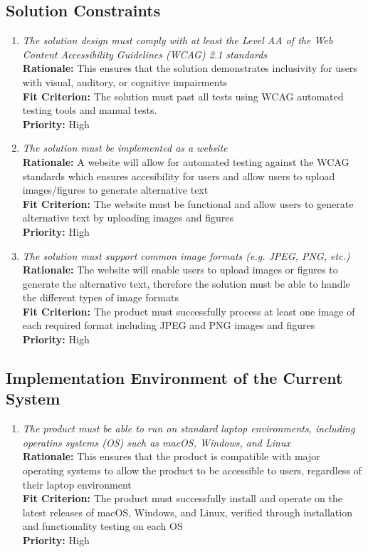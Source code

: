 \documentclass[12pt]{article}
\begin{document}
\subsection{Solution Constraints}
\begin{enumerate}[label=MD-SL \arabic*., wide=0pt, leftmargin=*]
  \item \emph{The solution design must comply with at least the Level AA of the Web Content Accessibility Guidelines (WCAG) 2.1 standards}\\[2mm]
    {\bf Rationale:} This ensures that the solution demonstrates inclusivity for users with visual, auditory, or cognitive impairments\\
    {\bf Fit Criterion:} The solution must past all tests using WCAG automated testing tools and manual tests.\\
    {\bf Priority:} High
  \item \emph{The solution must be implemented as a website}\\[2mm]
    {\bf Rationale:} A website will allow for automated testing against the WCAG standards which ensures accesibility for users 
    and allow users to upload images/figures to generate alternative text\\
    {\bf Fit Criterion:} The website must be functional and allow users to generate alternative text by uploading
    images and figures\\
    {\bf Priority:} High
  \item \emph{The solution must support common image formats (e.g. JPEG, PNG, etc.)}\\[2mm]
    {\bf Rationale:} The website will enable users to upload images or figures to generate the alternative text, therefore the solution must be able 
    to handle the different types of image formats\\
    {\bf Fit Criterion:} The product must successfully process at least one image of each required format including JPEG and PNG
    images and figures\\
    {\bf Priority:} High
\end{enumerate}

\subsection{Implementation Environment of the Current System}
\begin{enumerate}[label=MD-IE \arabic*., wide=0pt, leftmargin=*]
  \item \emph{The product must be able to run on standard laptop environments, including operatins systems (OS) such as 
  macOS, Windows, and Linux}\\[2mm]
    {\bf Rationale:} This ensures that the product is compatible with major operating systems to allow the product to be 
    accessible to users, regardless of their laptop environment\\
    {\bf Fit Criterion:} The product must successfully install and operate on the latest releases of macOS, Windows, and Linux,
    verified through installation and functionality testing on each OS\\
    {\bf Priority:} High
\end{enumerate}
\end{document}
